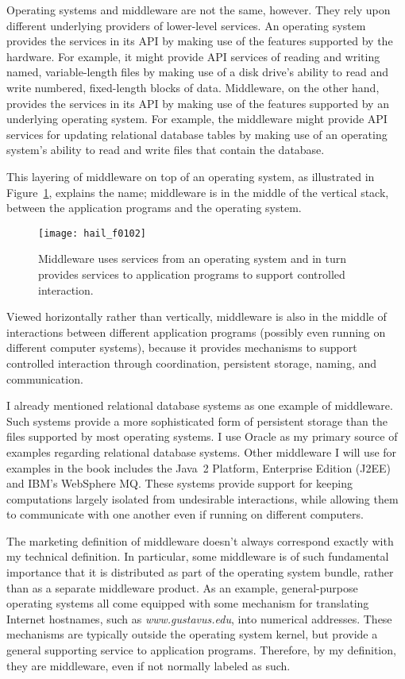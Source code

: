 Operating systems and middleware are not the same, however.  They rely upon
different underlying providers of lower-level services.  An
operating system provides the services in its API by making use of the
features supported by the hardware.  For example, it might provide API
services of reading and writing named, variable-length files by making
use of a disk drive's ability to read and write numbered, fixed-length
blocks of data.  Middleware, on the other hand, provides the services
in its API by making use of the features supported by an underlying
operating system.  For example, the middleware might provide API
services for updating relational database tables by making use of an
operating system's ability to read and write files that contain the database.

This layering of middleware on top of an operating system, as illustrated
in Figure~\ref{scan-1-2}, explains the
name; middleware is in the middle of the vertical stack, between the
application programs and the operating system.
\begin{figure}
\centerline{\texttt{[image: hail\_f0102]}}
\caption{Middleware uses services from an operating system and in turn
provides services to application programs to support controlled interaction.}
\label{scan-1-2}
\end{figure}
Viewed horizontally rather than vertically, middleware is also in the
middle of interactions between different application programs
(possibly even running on different computer systems), because it
provides mechanisms to support controlled interaction through
coordination, persistent storage, naming, and communication.

I already mentioned relational database systems as one example of
middleware.  Such systems provide a more sophisticated form of persistent storage
than the files supported by most operating systems.  I use Oracle as
my primary source of examples regarding relational database systems.
Other middleware I will use for examples in the book includes the
Java~2 Platform, Enterprise Edition (J2EE) and IBM's WebSphere MQ.  These
systems provide support for keeping computations largely isolated from
undesirable interactions, while allowing them to communicate with one
another even if running on different computers.

The marketing definition of middleware doesn't always correspond
exactly with my technical definition.  In particular, some middleware
is of such fundamental importance that it is distributed as part of
the operating system bundle, rather than as a separate middleware
product.  As an example, general-purpose operating systems all come
equipped with some mechanism for translating Internet hostnames, such as
\textit{www.gustavus.edu}, into numerical addresses.  These mechanisms are
typically outside the operating system kernel, but provide a general
supporting service to application programs.  Therefore, by my
definition, they are middleware, even if not normally labeled as such.

